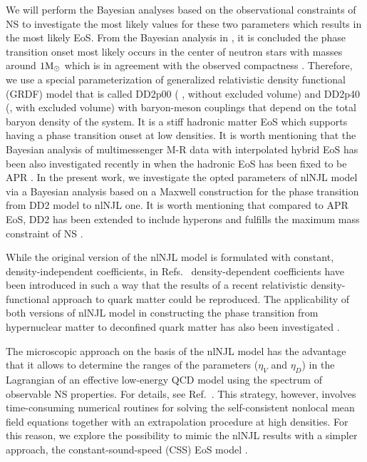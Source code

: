 \documentclass[%
 reprint,
superscriptaddress,
nofootinbib,
 amsmath,amssymb,
 aps,
]{revtex4-1}
\begin{document}
We will perform the Bayesian analyses based on the observational constraints of NS to investigate the most likely values for these two parameters which results in the most likely EoS. 
From the Bayesian analysis in \cite{Blaschke:2020qqj}, it is concluded the phase transition onset most likely occurs in the center of neutron stars with masses around
$1 \textmd{M}_{\odot}$ which is in agreement with the observed compactness \cite{capano2020stringent}. Therefore, we use a special parameterization of generalized relativistic density
functional (GRDF) model that is called DD2p00 ( \cite{Typel:2009sy}, without excluded volume) and DD2p40 (\cite{Typel:2009sy, Typel:2016srf}, with excluded volume) with baryon-meson couplings that
depend on the total baryon density of the system. It is a stiff hadronic matter EoS which supports having a phase transition onset at low densities. It is worth mentioning that the Bayesian analysis of multimessenger M-R data with interpolated hybrid EoS has been also investigated recently in \cite{Ayriyan:2021prr} when the hadronic EoS has been fixed to be APR \cite{Akmal:1998cf}. In the present work, we investigate the opted parameters of nlNJL model via a Bayesian analysis based on a Maxwell construction for the phase transition from DD2 model to nlNJL one. It is worth mentioning that compared to APR EoS, DD2 has been extended to include hyperons and fulfills the maximum mass constraint of NS \cite{Shahrbaf:2022upc}.

While the original version of the nlNJL model is formulated with constant, density-independent coefficients, 
in Refs.~\cite{Alvarez-Castillo:2018pve,Ayriyan:2018blj} 
density-dependent coefficients have been introduced in such a way that the results of a recent relativistic density-functional approach to quark matter \cite{Kaltenborn:2017hus} could be reproduced. The applicability of both versions of nlNJL model in constructing the phase transition from hypernuclear matter to deconfined quark matter has also been investigated \cite{Shahrbaf:2019vtf, Shahrbaf:2020uau}.

The microscopic approach on the basis of the nlNJL model has the advantage that it allows to determine the ranges of the parameters ($\eta_V$ and $\eta_D$) in the Lagrangian of an effective low-energy QCD model 
using the spectrum of observable NS properties. For details, see Ref.~\cite{ayriyan2021bayesian}. 
This strategy, however, involves time-consuming numerical routines for solving the self-consistent nonlocal mean field equations together with an extrapolation procedure at high densities. 
For this reason, we explore the possibility to mimic the nlNJL results with a simpler approach, the constant-sound-speed (CSS) EoS model \cite{Alford:2013aca,Zdunik:2012dj}. 
\end{document}
